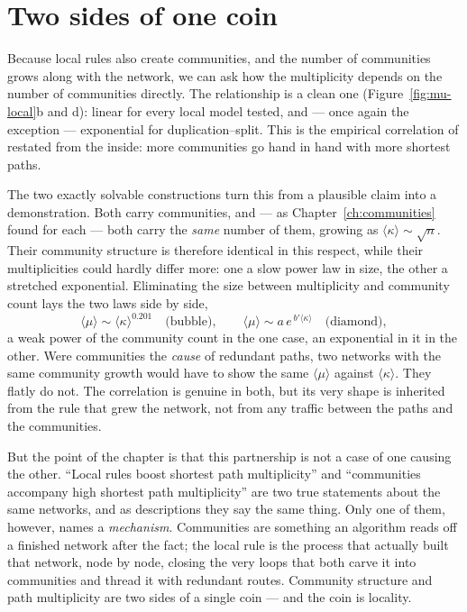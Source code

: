 \section{Two sides of one coin}

Because local rules also create communities, and the number of communities grows
along with the network, we can ask how the multiplicity depends on the number of
communities directly. The relationship is a clean one
(Figure~\ref{fig:mu-local}b and d): linear for every local model tested, and ---
once again the exception --- exponential for duplication--split. This is the
empirical correlation of \citet{deng2026} restated from the inside: more
communities go hand in hand with more shortest paths.

The two exactly solvable constructions turn this from a plausible claim into a
demonstration. Both carry communities, and --- as Chapter~\ref{ch:communities}
found for each --- both carry the \emph{same} number of them, growing as
$\langle\kappa\rangle\sim\sqrt{n}$. Their community structure is therefore
identical in this respect, while their multiplicities could hardly differ more:
one a slow power law in size, the other a stretched exponential. Eliminating the
size between multiplicity and community count lays the two laws side by side,
\begin{equation}
  \langle\mu\rangle \sim \langle\kappa\rangle^{0.201}
  \quad\text{(bubble)},
  \qquad
  \langle\mu\rangle \sim a\,e^{\,b'\langle\kappa\rangle}
  \quad\text{(diamond)},
  \label{eq:path-mukappa}
\end{equation}
a weak power of the community count in the one case, an exponential in it in the
other. Were communities the \emph{cause} of redundant paths, two networks with the
same community growth would have to show the same $\langle\mu\rangle$ against
$\langle\kappa\rangle$. They flatly do not. The correlation is genuine in both, but
its very shape is inherited from the rule that grew the network, not from any
traffic between the paths and the communities.

But the point of the chapter is that this partnership is not a case of one
causing the other. ``Local rules boost shortest path multiplicity'' and
``communities accompany high shortest path multiplicity'' are two true statements
about the same networks, and as descriptions they say the same thing. Only one of
them, however, names a \emph{mechanism}. Communities are something an algorithm
reads off a finished network after the fact; the local rule is the process that
actually built that network, node by node, closing the very loops that both carve
it into communities and thread it with redundant routes. Community structure and
path multiplicity are two sides of a single coin --- and the coin is locality.


